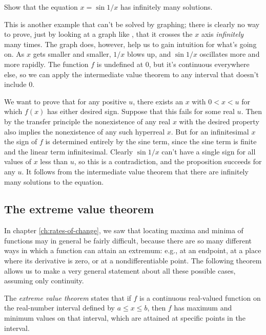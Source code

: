 \begin{eg}\label{eg:x-minus-sin-1-over-x}
\egquestion Show that the equation $x=\sin 1/x$ has infinitely many solutions.

\eganswer  This is another example that can't be solved by graphing; there is
clearly no way to prove, just by looking at a graph like , that it crosses the
$x$ axis \emph{infinitely} many times. The graph does, however, help us to gain intuition for what's
going on. As $x$ gets smaller and smaller, $1/x$ blows up, and $\sin 1/x$ oscillates more and more
rapidly. The function $f$ is undefined at 0, but it's continuous everywhere else, so we can apply the
intermediate value theorem to any interval that doesn't include 0.

We want to prove that for any positive $u$, there exists an $x$ with $0<x<u$ for which $f(x)$ has
either desired sign. Suppose that this fails for some real $u$. Then by the transfer principle the nonexistence
of any real $x$ with the desired property also implies the nonexistence of any such hyperreal $x$.
But for an infinitesimal $x$ the sign of $f$ is determined entirely by the sine term, since the sine
term is finite and the linear term infinitesimal. Clearly $\sin 1/x$ can't have a single sign for
all values of $x$ less than $u$, so this is a contradiction, and the proposition succeeds for any $u$.
It follows from the intermediate value theorem that there are infinitely many solutions to the equation.
\end{eg}


\subsection{The extreme value theorem}

In chapter \ref{ch:rates-of-change}, we saw that locating maxima and minima of functions may in general
be fairly difficult, because there are so many different ways in which a function can attain an extremum:
e.g., at an endpoint, at a place where its derivative is zero, or at a nondifferentiable point. The following
theorem allows us to make a very general statement about all these possible cases, assuming only continuity.

The \emph{extreme value theorem}\label{extreme-value-theorem}
states that if $f$ is a continuous real-valued function on the real-number
interval defined by $a \le x \le b$, then $f$ has maximum and minimum values on that interval, which are
attained at specific points in the interval.

